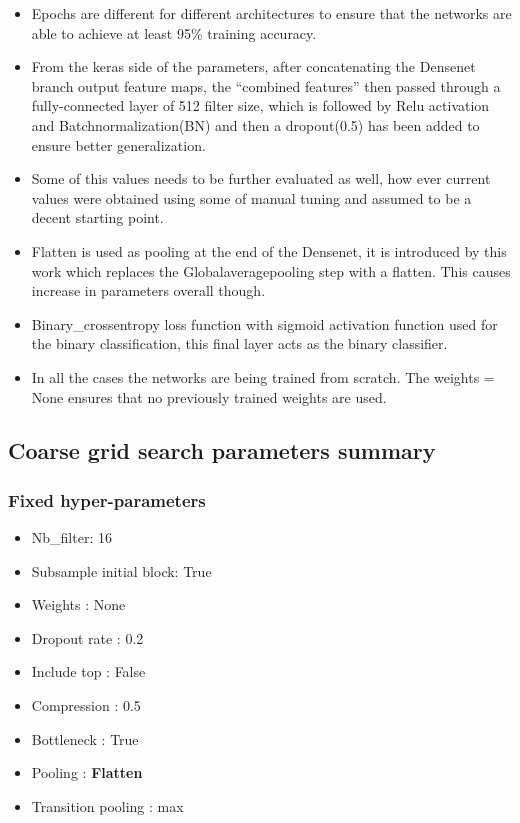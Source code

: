 \begin{itemize}
 \item Epochs are different for different architectures to ensure that the networks are able to achieve at least 95\% training accuracy. 
 \item From the keras side of the parameters, after concatenating the Densenet branch output feature maps, the “combined features” then passed through a fully-connected  
 layer of 512 filter size, which is followed by Relu activation and Batchnormalization(BN)  and then a dropout(0.5) has been added to ensure better generalization. 
 \item Some of this values needs to be further evaluated as well, how ever current values were obtained using some of manual tuning and assumed to be a decent starting point.
 \item Flatten is used as pooling at the end of the Densenet, it is introduced by this work which replaces the Globalaveragepooling step with a flatten. This causes increase 
 in parameters overall though.
 \item Binary\_crossentropy loss function with sigmoid activation function used for the binary classification, this final layer acts as the binary classifier.
 \item In all the cases the networks are being trained from scratch. The weights = None ensures that no previously trained weights are used.
\end{itemize}

\subsection{Coarse grid search parameters summary}
\subsubsection{Fixed hyper-parameters}
\begin{itemize}
 \item Nb\_filter: 16
 \item Subsample initial block: True
 \item Weights : None
 \item Dropout rate : 0.2
 \item Include top : False
 \item Compression : 0.5
 \item Bottleneck : True
 \item Pooling : \textbf{Flatten}
 \item Transition pooling : max
\end{itemize}

